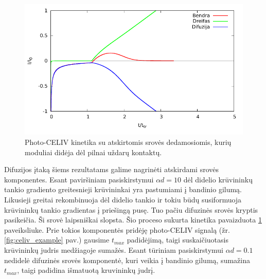 \begin{figure}[ht]
  \centering
	\includegraphics{./media/pdf/separate.pdf}
  \caption{Photo-CELIV kinetika su atskirtomis srovės dedamosiomis, kurių moduliai didėja dėl pilnai uždarų kontaktų.}
  \label{fig:separate}
\end{figure}

Difuzijos įtaką šiems rezultatams galime nagrinėti atskirdami srovės komponentes. Esant paviršiniam pasiskirstymui $\alpha d = 10$ dėl didelio krūvininkų tankio gradiento greitesnieji krūvininkai yra pastumiami į bandinio gilumą. Likusieji greitai rekombinuoja dėl didelio tankio ir tokiu būdų susiformuoja krūvininkų tankio gradientas į priešingą pusę. Tuo pačiu difuzinės srovės kryptis pasikeičia. Ši srovė laipsniškai slopsta. Šio proceso sukurta kinetika pavaizduota \ref{fig:separate} paveiksliuke. Prie tokios komponentės pridėję photo-CELIV signalą (žr. \ref{fig:celiv_example} pav.) gausime $t_{max}$ padidėjimą, taigi suskaičiuotasis krūvininkų judris medžiagoje sumažės. Esant tūriniam pasiskirstymui $\alpha d = 0.1$ nedidelė difuzinės srovės komponentė, kuri veikia į bandinio gilumą, sumažina $t_{max}$, taigi padidina išmatuotą kruvininkų judrį.
